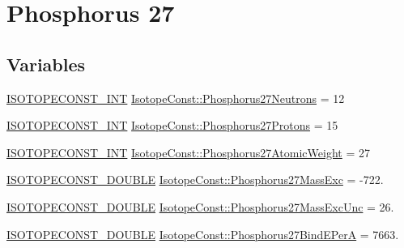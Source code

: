 \hypertarget{group___isotope_const-_phosphorus-_p27}{}\section{Phosphorus 27}
\label{group___isotope_const-_phosphorus-_p27}
\subsection*{Variables}
\begin{DoxyCompactItemize}
\item 
\mbox{\hyperlink{group___isotope_const-_macros_ga5f18360b3e99483a35c32d789e62621c}{I\+S\+O\+T\+O\+P\+E\+C\+O\+N\+S\+T\+\_\+\+I\+NT}} \mbox{\hyperlink{group___isotope_const-_phosphorus-_p27_ga59fb185dfa1e5741327aa7c59a1b6470}{Isotope\+Const\+::\+Phosphorus27\+Neutrons}} = 12
\item 
\mbox{\hyperlink{group___isotope_const-_macros_ga5f18360b3e99483a35c32d789e62621c}{I\+S\+O\+T\+O\+P\+E\+C\+O\+N\+S\+T\+\_\+\+I\+NT}} \mbox{\hyperlink{group___isotope_const-_phosphorus-_p27_ga513afaf9335a4cac4871af026b7b5509}{Isotope\+Const\+::\+Phosphorus27\+Protons}} = 15
\item 
\mbox{\hyperlink{group___isotope_const-_macros_ga5f18360b3e99483a35c32d789e62621c}{I\+S\+O\+T\+O\+P\+E\+C\+O\+N\+S\+T\+\_\+\+I\+NT}} \mbox{\hyperlink{group___isotope_const-_phosphorus-_p27_gabecb6aac42658285f58592f20b14aeb1}{Isotope\+Const\+::\+Phosphorus27\+Atomic\+Weight}} = 27
\item 
\mbox{\hyperlink{group___isotope_const-_macros_ga8f45a7272ce02c0b4c65c44636ed719a}{I\+S\+O\+T\+O\+P\+E\+C\+O\+N\+S\+T\+\_\+\+D\+O\+U\+B\+LE}} \mbox{\hyperlink{group___isotope_const-_phosphorus-_p27_ga6d2fa83895ee577deef090c5bb237d96}{Isotope\+Const\+::\+Phosphorus27\+Mass\+Exc}} = -\/722.
\item 
\mbox{\hyperlink{group___isotope_const-_macros_ga8f45a7272ce02c0b4c65c44636ed719a}{I\+S\+O\+T\+O\+P\+E\+C\+O\+N\+S\+T\+\_\+\+D\+O\+U\+B\+LE}} \mbox{\hyperlink{group___isotope_const-_phosphorus-_p27_ga4be70a497468170ffcc0eb30f7ee76df}{Isotope\+Const\+::\+Phosphorus27\+Mass\+Exc\+Unc}} = 26.
\item 
\mbox{\hyperlink{group___isotope_const-_macros_ga8f45a7272ce02c0b4c65c44636ed719a}{I\+S\+O\+T\+O\+P\+E\+C\+O\+N\+S\+T\+\_\+\+D\+O\+U\+B\+LE}} \mbox{\hyperlink{group___isotope_const-_phosphorus-_p27_ga1339ee911e9d0b623e26699d4e8e0e53}{Isotope\+Const\+::\+Phosphorus27\+Bind\+E\+PerA}} = 7663.
\item 

\end{DoxyCompactItemize}
